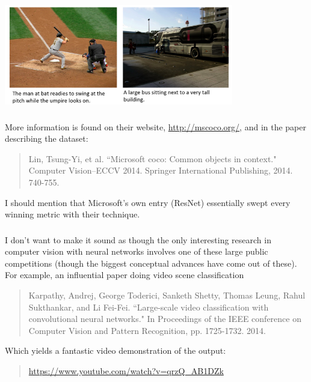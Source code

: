 \documentclass[xetex,mathserif,serif,aspectratio=169]{beamer}
\begin{document}
\begin{frame}[fragile] \frametitle{} \oldB \small

\begin{center}
\includegraphics[width=0.75\textwidth]{img/mscocoCaption.jpg}
\end{center}

\end{frame}

\begin{frame}[fragile] \frametitle{} \oldB \small

More information is found on their website, \url{http://mscoco.org/},
and in the paper describing the dataset:
\begin{quote}
Lin, Tsung-Yi, et al. ``Microsoft coco: Common objects in context."
Computer Vision–ECCV 2014. Springer International Publishing, 2014. 740-755.
\end{quote}
I should mention that Microsoft's own entry (ResNet) essentially
swept every winning metric with their technique.

\end{frame}

\begin{frame}[fragile] \frametitle{} \oldB \small


I don't want to make it sound as though the only interesting research
in computer vision with neural networks involves one of these large
public competitions (though the biggest conceptual advances have come out of
these). For example, an influential paper doing video scene classification
\begin{quote}
Karpathy, Andrej, George Toderici, Sanketh Shetty, Thomas Leung, Rahul Sukthankar, and Li Fei-Fei. ``Large-scale video classification with convolutional neural networks." In Proceedings of the IEEE conference on Computer Vision and Pattern Recognition, pp. 1725-1732. 2014.
\end{quote}
Which yields a fantastic video demonstration of the output:
\begin{quote}
\url{https://www.youtube.com/watch?v=qrzQ_AB1DZk}
\end{quote}

\end{frame}
\end{document}
